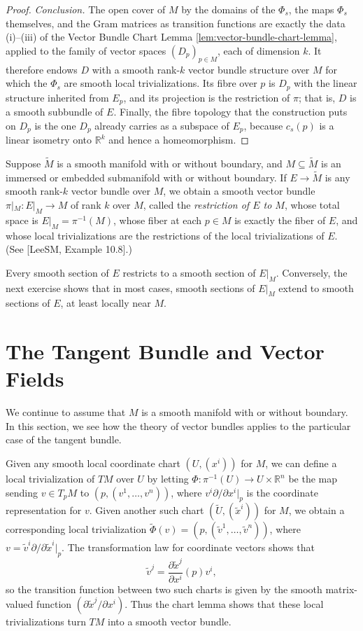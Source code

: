 \begin{proof}
\textit{Conclusion.} The open cover of $M$ by the domains of the $\Phi_s$, the maps $\Phi_s$ themselves, and the Gram matrices as transition functions are exactly the data (i)--(iii) of the Vector Bundle Chart Lemma \ref{lem:vector-bundle-chart-lemma}, applied to the family of vector spaces $(D_p)_{p \in M}$, each of dimension $k$. It therefore endows $D$ with a smooth rank-$k$ vector bundle structure over $M$ for which the $\Phi_s$ are smooth local trivializations. Its fibre over $p$ is $D_p$ with the linear structure inherited from $E_p$, and its projection is the restriction of $\pi$; that is, $D$ is a smooth subbundle of $E$. Finally, the fibre topology that the construction puts on $D_p$ is the one $D_p$ already carries as a subspace of $E_p$, because $c_s(p)$ is a linear isometry onto $\mathbb{R}^k$ and hence a homeomorphism.
\end{proof}

Suppose $\tilde{M}$ is a smooth manifold with or without boundary, and $M \subseteq \tilde{M}$ is an immersed or embedded submanifold with or without boundary. If $E \to \tilde{M}$ is any smooth rank-$k$ vector bundle over $M$, we obtain a smooth vector bundle $\pi|_M : E|_M \to M$ of rank $k$ over $M$, called the \emph{restriction of $E$ to $M$}, whose total space is $E|_M = \pi^{-1}(M)$, whose fiber at each $p \in M$ is exactly the fiber of $E$, and whose local trivializations are the restrictions of the local trivializations of $E$. (See [LeeSM, Example 10.8].)

Every smooth section of $E$ restricts to a smooth section of $E|_M$. Conversely, the next exercise shows that in most cases, smooth sections of $E|_M$ extend to smooth sections of $E$, at least locally near $M$.

\section{The Tangent Bundle and Vector Fields}

We continue to assume that $M$ is a smooth manifold with or without boundary. In this section, we see how the theory of vector bundles applies to the particular case of the tangent bundle.

Given any smooth local coordinate chart $(U, (x^i))$ for $M$, we can define a local trivialization of $TM$ over $U$ by letting $\Phi: \pi^{-1}(U) \to U \times \mathbb{R}^n$ be the map sending $v \in T_pM$ to $(p, (v^1, \ldots, v^n))$, where $v^i\partial/\partial x^i|_p$ is the coordinate representation for $v$. Given another such chart $(\tilde{U}, (\tilde{x}^i))$ for $M$, we obtain a corresponding local trivialization $\tilde{\Phi}(v) = (p, (\tilde{v}^1, \ldots, \tilde{v}^n))$, where $v = \tilde{v}^i \partial/\partial \tilde{x}^i|_p$. The transformation law for coordinate vectors shows that
\[
\tilde{v}^j = \frac{\partial \tilde{x}^j}{\partial x^i}(p)v^i,
\]
so the transition function between two such charts is given by the smooth matrix-valued function $(\partial \tilde{x}^j/\partial x^i)$. Thus the chart lemma shows that these local trivializations turn $TM$ into a smooth vector bundle.

